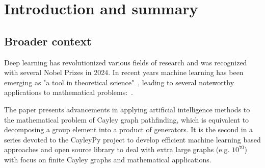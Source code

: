\documentclass[atmp]{ipart_v1}
\numberwithin{equation}{section}
\theoremstyle{plain}%
\begin{document}
\begin{abstract}






\end{abstract}

\maketitle


\section{Introduction and summary}
\subsection{Broader context}
Deep learning has revolutionized various fields of research and was recognized with several Nobel Prizes in 2024.  
In recent years machine learning has been emerging as "a tool in theoretical science"~\cite{douglas2022machine}, leading to several noteworthy applications to mathematical problems:~\cite{lample2019deep,davies2021advancing, bao2021polytopes, 
romera2024mathematical,
coates2024machine,alfarano2024global, charton2024patternboost,shehper2024makes,swirszcz2025advancing}.
 
The paper presents advancements in applying artificial intelligence methods to the mathematical problem of Cayley graph pathfinding, which is equivalent to decomposing a group element into a product of generators. It is the second in a series devoted to the CayleyPy project to develop efficient machine learning based approaches and open source library to deal with extra large graphs
(e.g. $10^{70}$) with focus on finite Cayley graphs and mathematical applications.
\end{document}
